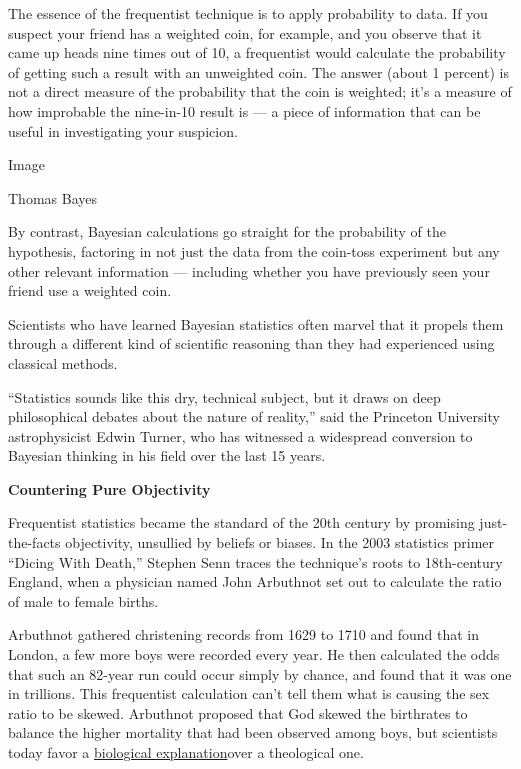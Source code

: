 The essence of the frequentist technique is to apply probability to
data. If you suspect your friend has a weighted coin, for example, and
you observe that it came up heads nine times out of 10, a frequentist
would calculate the probability of getting such a result with an
unweighted coin. The answer (about 1 percent) is not a direct measure of
the probability that the coin is weighted; it's a measure of how
improbable the nine-in-10 result is --- a piece of information that can
be useful in investigating your suspicion.

Image

Thomas Bayes

By contrast, Bayesian calculations go straight for the probability of
the hypothesis, factoring in not just the data from the coin-toss
experiment but any other relevant information --- including whether you
have previously seen your friend use a weighted coin.

Scientists who have learned Bayesian statistics often marvel that it
propels them through a different kind of scientific reasoning than they
had experienced using classical methods.

``Statistics sounds like this dry, technical subject, but it draws on
deep philosophical debates about the nature of reality,'' said the
Princeton University astrophysicist Edwin Turner, who has witnessed a
widespread conversion to Bayesian thinking in his field over the last 15
years.

\textbf{Countering Pure Objectivity}

Frequentist statistics became the standard of the 20th century by
promising just-the-facts objectivity, unsullied by beliefs or biases. In
the 2003 statistics primer ``Dicing With Death,'' Stephen Senn traces
the technique's roots to 18th-century England, when a physician named
John Arbuthnot set out to calculate the ratio of male to female births.

Arbuthnot gathered christening records from 1629 to 1710 and found that
in London, a few more boys were recorded every year. He then calculated
the odds that such an 82-year run could occur simply by chance, and
found that it was one in trillions. This frequentist calculation can't
tell them what is causing the sex ratio to be skewed. Arbuthnot proposed
that God skewed the birthrates to balance the higher mortality that had
been observed among boys, but scientists today favor a
\href{http://www.livescience.com/33491-male-female-sex-ratio.html}{biological
explanation}over a theological one.

